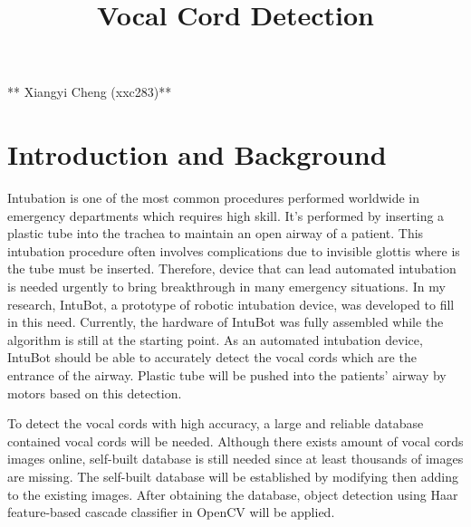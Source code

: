 \documentclass[11pt]{article}
\title{Vocal Cord Detection}
\begin{document}
    
    
    \maketitle
    
    

    
    ** Xiangyi Cheng (xxc283)**

    \hypertarget{introduction-and-background}{%
\section{Introduction and
Background}\label{introduction-and-background}}

    Intubation is one of the most common procedures performed worldwide in
emergency departments which requires high skill. It's performed by
inserting a plastic tube into the trachea to maintain an open airway of
a patient. This intubation procedure often involves complications due to
invisible glottis where is the tube must be inserted. Therefore, device
that can lead automated intubation is needed urgently to bring
breakthrough in many emergency situations. In my research, IntuBot, a
prototype of robotic intubation device, was developed to fill in this
need. Currently, the hardware of IntuBot was fully assembled while the
algorithm is still at the starting point. As an automated intubation
device, IntuBot should be able to accurately detect the vocal cords
which are the entrance of the airway. Plastic tube will be pushed into
the patients' airway by motors based on this detection.

To detect the vocal cords with high accuracy, a large and reliable
database contained vocal cords will be needed. Although there exists
amount of vocal cords images online, self-built database is still needed
since at least thousands of images are missing. The self-built database
will be established by modifying then adding to the existing images.
After obtaining the database, object detection using Haar feature-based
cascade classifier in OpenCV will be applied.
\end{document}
